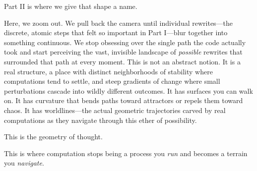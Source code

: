 Part II is where we give that shape a name.

Here, we zoom out. We pull back the camera until individual rewrites---the discrete, atomic steps that felt so important in Part I---blur together into something continuous. We stop obsessing over the single path the code actually took and start perceiving the vast, invisible landscape of \emph{possible} rewrites that surrounded that path at every moment. This is not an abstract notion. It is a real structure, a place with distinct neighborhoods of stability where computations tend to settle, and steep gradients of change where small perturbations cascade into wildly different outcomes. It has surfaces you can walk on. It has curvature that bends paths toward attractors or repels them toward chaos. It has worldlines---the actual geometric trajectories carved by real computations as they navigate through this ether of possibility.

This is the geometry of thought.

This is where computation stops being a process you \emph{run} and becomes a terrain you \emph{navigate}.

